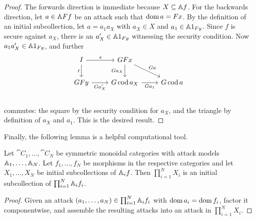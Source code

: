 \begin{proof}
  The forwards direction is immediate because $X\subseteq \AA f$. For the
  backwards direction, let $a\in \AA Ff$ be an attack such that $\dom a = Fx$.
  By the definition of an initial subcollection, let $a = a_1a_X$ with $a_X\in
  X$ and $a_1\in \AA 1_{Fy}$. Since $f$ is secure against $a_X$, there is an
  $a_X'\in \AA 1_{Fy}$ witnessing the security condition. Now $a_1a_X'\in\AA
  1_{Fy}$, and further \[
    \begin{tikzcd}
      I\ar[r, "s"]\ar[d, "t"'] & GFx\ar[d, "Ga_X"']\ar[dr, "Ga"]\\
      GFy\ar[r, "Ga_X'"'] & G\cod a_X\ar[r, "Ga_1"'] & G\cod a \\
    \end{tikzcd}
  \] commutes: the square by the security condition for $a_X$, and the triangle
  by definition of $a_X$ and $a_1$. This is the desired result.
\end{proof}

Finally, the following lemma is a helpful computational tool.

\begin{prop}
  Let $\cat{C}_1,\dots,\cat{C}_N$ be symmetric monoidal categories with attack
  models $\AA_1,\dots,\AA_N$. Let $f_1,\dots,f_N$ be morphisms in the respective
  categories and let $X_1,\dots,X_N$ be initial subcollections of $\AA_i f$.
  Then $\prod_{i=1}^N X_i$ is an initial subcollection of $\prod_{i=1}^N \AA_i f_i$.
\end{prop}

\begin{proof}
  Given an attack $(a_1,\dots,a_N)\in\prod_{i=1}^N \AA_i f_i$ with $\dom a_i =
  \dom f_i$, factor it componentwise, and assemble the resulting attacks into an
  attack in $\prod_{i=1}^N X_i$.
\end{proof}

%

